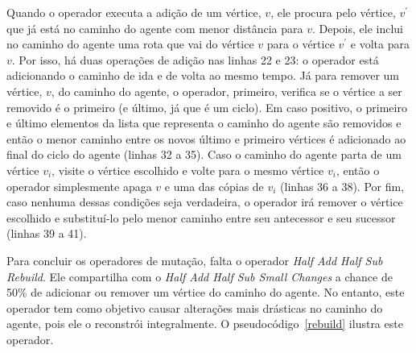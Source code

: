 Quando o operador executa a adição de um vértice, $v$, ele procura pelo vértice, 
$v^{\prime}$ que já está no caminho do agente com menor distância para $v$. 
Depois, ele inclui no caminho do agente uma rota que vai do vértice $v$ para o 
vértice $v^{\prime}$ e volta para $v$. Por isso, há duas operações de adição 
nas linhas 22 e 23: o operador está adicionando o caminho de ida e de volta ao 
mesmo tempo. Já para remover um vértice, $v$, do caminho do agente, o operador, 
primeiro, verifica se o vértice a ser removido é o primeiro (e último, já que é 
um ciclo). Em caso positivo, o primeiro e último elementos da lista que 
representa o caminho do agente são removidos e então o menor caminho entre os 
novos último e primeiro vértices é adicionado ao final do ciclo do agente 
(linhas 32 a 35). Caso o caminho do agente parta de um vértice $v_{i}$, visite o 
vértice escolhido e volte para o mesmo vértice $v_{i}$, então o operador 
simplesmente apaga $v$ e uma das cópias de $v_{i}$ (linhas 36 a 38). Por fim, 
caso nenhuma dessas condições seja verdadeira, o operador irá remover o vértice 
escolhido e substituí-lo pelo menor caminho entre seu antecessor e seu sucessor 
(linhas 39 a 41).

Para concluir os operadores de mutação, falta o operador 
\textit{Half Add Half Sub Rebuild}. Ele compartilha com o 
\textit{Half Add Half Sub Small Changes} a chance de 50\% de adicionar ou 
remover um vértice do caminho do agente. No entanto, este operador tem como 
objetivo causar alterações mais drásticas no caminho do agente, pois ele o
reconstrói integralmente. O pseudocódigo~\ref{rebuild} ilustra este operador.

